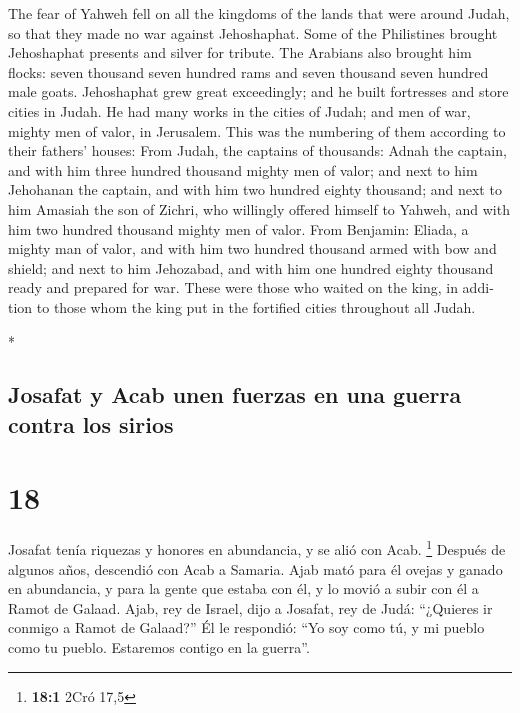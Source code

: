 \begin{paracol}{2}
\begin{otherlanguage}{english}
 The fear of Yahweh fell on all the kingdoms of the lands
that were around Judah, so that they made no war against Jehoshaphat.
 Some of the Philistines brought Jehoshaphat presents and
silver for tribute. The Arabians also brought him flocks: seven thousand
seven hundred rams and seven thousand seven hundred male goats.
 Jehoshaphat grew great exceedingly; and he built
fortresses and store cities in Judah.  He had many works
in the cities of Judah; and men of war, mighty men of valor, in
Jerusalem.  This was the numbering of them according to
their fathers' houses: From Judah, the captains of thousands: Adnah the
captain, and with him three hundred thousand mighty men of valor;
 and next to him Jehohanan the captain, and with him two
hundred eighty thousand;  and next to him Amasiah the son
of Zichri, who willingly offered himself to Yahweh, and with him two
hundred thousand mighty men of valor.  From Benjamin:
Eliada, a mighty man of valor, and with him two hundred thousand armed
with bow and shield;  and next to him Jehozabad, and with
him one hundred eighty thousand ready and prepared for war.
 These were those who waited on the king, in addition to
those whom the king put in the fortified cities throughout all Judah.

\end{otherlanguage}

\switchcolumn[0]*

\hypertarget{josafat-y-acab-unen-fuerzas-en-una-guerra-contra-los-sirios}{%
\subsection{Josafat y Acab unen fuerzas en una guerra contra los
sirios}\label{josafat-y-acab-unen-fuerzas-en-una-guerra-contra-los-sirios}}

\hypertarget{section-34}{%
\section{18}\label{section-34}}

 Josafat tenía riquezas y honores en abundancia, y se alió
con Acab. \footnote{\textbf{18:1} 2Cró 17,5}  Después de
algunos años, descendió con Acab a Samaria. Ajab mató para él ovejas y
ganado en abundancia, y para la gente que estaba con él, y lo movió a
subir con él a Ramot de Galaad.  Ajab, rey de Israel, dijo
a Josafat, rey de Judá: ``¿Quieres ir conmigo a Ramot de Galaad?'' Él le
respondió: ``Yo soy como tú, y mi pueblo como tu pueblo. Estaremos
contigo en la guerra''.


\end{paracol}
